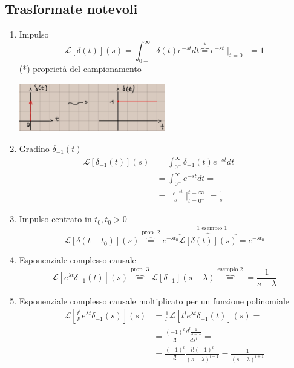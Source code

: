 \documentclass[a4paper, 12pt]{book}
\theoremstyle{plain}
\begin{document}
\subsection{Trasformate notevoli}

\begin{enumerate}
    \item Impulso \[ \mathcal{L} [\delta(t)] (s) = \int_{0-}^\infty \delta (t) e^{-st} dt \overbrace{=}^* e^{-st} \mid_{t = 0^-} = 1 \] (*) proprietà del campionamento \begin{center} \includegraphics[width=0.5\textwidth]{trasf_not_1.jpg} \end{center}
    \item Gradino $\delta_{-1}(t)$ 
    \[
        \begin{split}
            \mathcal{L}[\delta_{-1} (t)] (s) &= \int_{0^-}^\infty \delta_{-1} (t) e^{-st} dt = \\
            &= \int_{0^-}^\infty e^{-st} dt = \\
            &= \frac{-e^{-st}}{s} \mid_{t = 0^-}^{t = \infty} = \frac{1}{s}
        \end{split}
    \]
    \item Impulso centrato in $t_0, t_0 > 0$ \[ \mathcal{L} [\delta (t - t_0)] (s) \overbrace{=}^{\textrm{prop. 2}} e^{-st_0} \overbrace{\mathcal{L} [ \delta(t) ](s)}^{= 1 \textrm{ esempio 1}} = e^{-st_0} \]
    \item Esponenziale complesso causale \[ \mathcal{L}[e^{\lambda t} \delta_{-1} (t)](s) \overbrace{=}^{\textrm{prop. 3}} \mathcal{L}[\delta_{-1}](s- \lambda) \overbrace{=}^{\textrm{esempio 2}} = \frac{1}{s - \lambda} \]
    \item Esponenziale complesso causale moltiplicato per un funzione polinomiale 
    \[
        \begin{split}
            \mathcal{L}[\frac{t^l}{l!} e^{\lambda t} \delta_{-1}(s)](s) &= \frac{1}{l!} \mathcal{L}[t^l e^{\lambda t} \delta_{-1} (t)] (s) = \\
            &= \frac{(-1)^l}{l!} \frac{d^l\frac{1}{s - \lambda}}{ds^l} = \\
            &= \frac{(-1)^l}{l!} \frac{l!(-1)^l}{(s-\lambda)^{l + 1}} = \frac{1}{(s-\lambda)^{l + 1}}
        \end{split}
\]
\end{enumerate}
\end{document}

